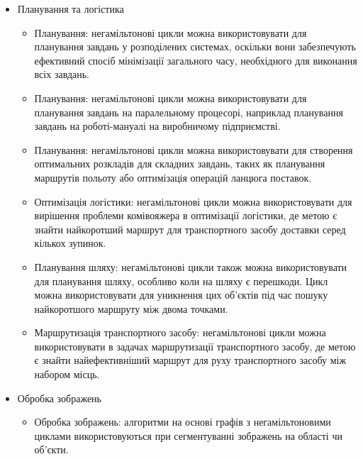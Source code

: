 \documentclass[14pt]{article}
\begin{document}
\begin{spacing}{1.175}
\begin{itemize}
\begin{itemize}
        \end{itemize}

        \newpage
        \item Планування та логістика
        \begin{itemize}
            
            \item Планування: негамільтонові цикли можна використовувати для планування завдань у розподілених системах, оскільки вони забезпечують ефективний спосіб мінімізації загального часу, необхідного для виконання всіх завдань.

            \item Планування: негамільтонові цикли можна використовувати для планування завдань на паралельному процесорі, наприклад планування завдань на роботі-мануалі на виробничому підприємстві.
            
            \item Планування: негамільтонові цикли можна використовувати для створення оптимальних розкладів для складних завдань, таких як планування маршрутів польоту або оптимізація операцій ланцюга поставок.
            
            \item Оптимізація логістики: негамільтонові цикли можна використовувати для вирішення проблеми комівояжера в оптимізації логістики, де метою є знайти найкоротший маршрут для транспортного засобу доставки серед кількох зупинок.

            \item Планування шляху: негамільтонові цикли також можна використовувати для планування шляху, особливо коли на шляху є перешкоди. Цикл можна використовувати для уникнення цих об’єктів під час пошуку найкоротшого маршруту між двома точками.

            \item Маршрутизація транспортного засобу: негамільтонові цикли можна використовувати в задачах маршрутизації транспортного засобу, де метою є знайти найефективніший маршрут для руху транспортного засобу між набором місць.
        
        \end{itemize}

            
        \item Обробка зображень
        \begin{itemize}
    
            \item Обробка зображень: алгоритми на основі графів з негамільтоновими циклами використовуються при сегментуванні зображень на області чи об’єкти.
            

\end{itemize}
\end{itemize}
\end{spacing}
\end{document}
